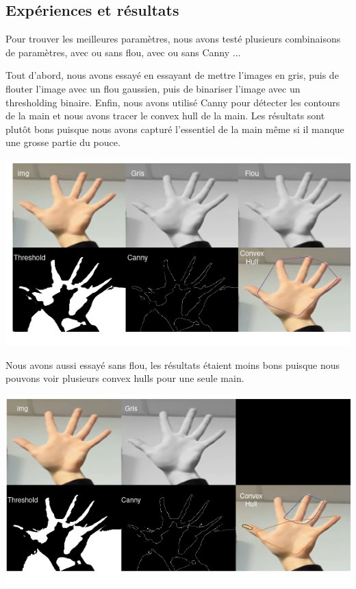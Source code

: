 \documentclass[11pt]{article}
\begin{document}
\subsection{Expériences et résultats}
Pour trouver les meilleures paramètres, nous avons testé plusieurs combinaisons de paramètres, avec ou sans flou, avec ou sans Canny ...

\bigbreak

Tout d'abord, nous avons essayé en essayant de mettre l'images en gris, puis de flouter l'image avec un flou gaussien, puis de binariser l'image avec un thresholding binaire. Enfin, nous avons utilisé Canny pour détecter les contours de la main et nous avons tracer le convex hull de la main. Les résultats sont plutôt bons puisque nous avons capturé l'essentiel de la main même si il manque une grosse partie du pouce.\bigbreak

\begin{center}
    \includegraphics[width=\textwidth]{images/pre_ttt_1.png}
\end{center}
\bigbreak

\bigbreak

Nous avons aussi essayé sans flou, les résultats étaient moins bons puisque nous pouvons voir plusieurs convex hulls pour une seule main. 
\bigbreak

\begin{center}
    \includegraphics[width=\textwidth]{images/pre_ttt_2.png}
\end{center}
\bigbreak
\end{document}
